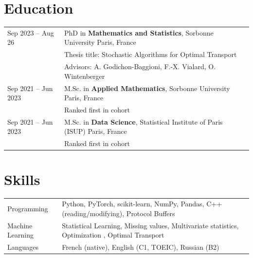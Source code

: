 \documentclass[a4paper,10pt]{article}
\begin{document}
\section{Education}
\begin{tabularx}{\linewidth}{@{}l X@{}}
    Sep 2023 -- Aug 26   & PhD in \textbf{Mathematics and Statistics}, Sorbonne University \hfill Paris, France       \\
                         & Thesis title: Stochastic Algorithms for Optimal Transport                                  \\
                         & Advisors: A. Godichon-Baggioni, F.-X. Vialard, O. Wintenberger                             \\[3pt]

    Sep 2021 -- Jun 2023 & M.Sc. in \textbf{Applied Mathematics}, Sorbonne University \hfill Paris, France            \\
                         & Ranked first in cohort                                                                     \\[3pt]

    Sep 2021 -- Jun 2023 & M.Sc. in \textbf{Data Science}, Statistical Institute of Paris (ISUP) \hfill Paris, France \\
                         & Ranked first in cohort                                                                     \\
\end{tabularx}




\section{Skills}
\begin{tabularx}{\linewidth}{@{}l X@{}}
    Programming      & \normalsize{Python, PyTorch, scikit-learn, NumPy, Pandas, C++ (reading/modifying), Protocol Buffers}         \\
    Machine Learning & \normalsize{Statistical Learning, Missing values, Multivariate statistics, Optimization , Optimal Transport} \\
    Languages        & \normalsize{French (native), English (C1, TOEIC), Russian (B2)}                                              \\
\end{tabularx}

\vfill
{}
\end{document}
